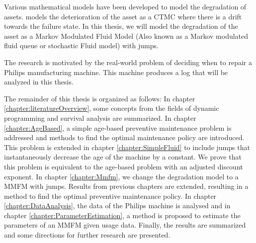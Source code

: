 Various mathematical models have been developed to model the degradation of assets.
\cite{Derman1963} models the deterioration of the asset as a CTMC where there is a drift towards the failure state.
In this thesis, we will model the degradation of the asset as a Markov Modulated Fluid Model (Also known as a Markov modulated fluid queue or stochastic Fluid model) with jumps.

The research is motivated by the real-world problem of deciding when to repair a Philips manufacturing machine.
This machine produces a log that will be analyzed in this thesis.

The remainder of this thesis is organized as follows:
In chapter \ref{chapter:literatureOverview}, some concepts from the fields of dynamic programming and survival analysis are summarized.  
In chapter \ref{chapter:AgeBased}, a simple age-based preventive maintenance problem is addressed and methods to find the optimal maintenance policy are introduced.
This problem is extended in chapter \ref{chapter:SimpleFluid} to include jumps that instantaneously decrease the age of the machine by a constant.
We prove that this problem is equivalent to the age-based problem with an adjusted discount exponent.
In chapter \ref{chapter:Mmfm}, we change the degradation model to a MMFM with jumps.
Results from previous chapters are extended, resulting in a method to find the optimal preventive maintenance policy.
In chapter \ref{chapter:DataAnalysis}, the data of the Philips machine is analysed and in chapter \ref{chapter:ParameterEstimation}, a method is proposed to estimate the parameters of an MMFM given usage data.
Finally, the results are summarized and some directions for further research are presented.

